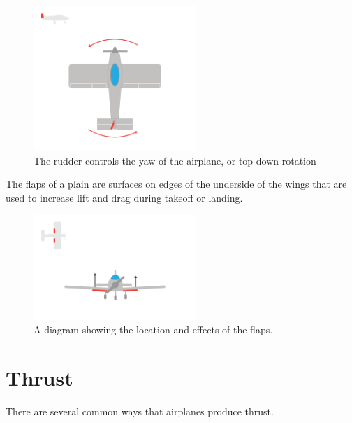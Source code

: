 \begin{figure}[htbp]
  \centering
  \includegraphics[width=0.55\textwidth]{rudder.png}
  \caption{The rudder controls the yaw of the airplane, or top-down rotation}\label{fig:rudderYaw}
\end{figure}

The flaps of a plain are surfaces on edges of the underside of the wings that are used to increase lift and drag during takeoff or landing.

\begin{figure}[htbp]
  \centering
  \includegraphics[width=0.55\textwidth]{flaps.png}
  \caption{A diagram showing the location and effects of the flaps.}\label{fig:flaps}
\end{figure}



\section{Thrust}

There are several common ways that airplanes produce thrust.

